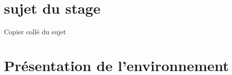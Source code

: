 \section{sujet du stage}
    Copier collé du sujet
    
\section{Présentation de l’environnement}






